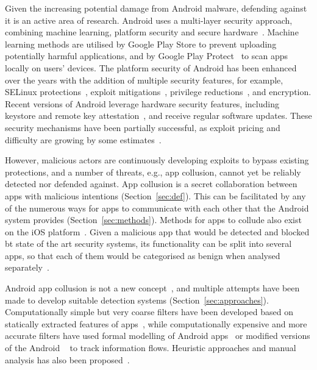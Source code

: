 \documentclass[article, oneside]{aaltoseries}
\newcommand{\Sref}[1]{Section~\ref{#1}}
\renewcommand\gls\cgls
\begin{document}
Given the increasing potential damage from Android malware, defending against it is an active area of research. Android uses a multi-layer security approach, combining machine learning, platform security and secure hardware~\cite{AOSP2018}. Machine learning methods are utilised by Google Play Store to prevent uploading potentially harmful applications, and by Google Play Protect~\cite{AOSPplayprotect} to scan apps locally on users' devices. The platform security of Android has been enhanced over the years with the addition of multiple security features, for example, SELinux protections~\cite[\href{https://source.android.com/security/selinux}{``Security-Enhanced Linux in Android''}]{AOSPsecurity}, exploit mitigations~\cite{Edge2016}, privilege reductions~\cite{Lawrence2017}, and encryption. Recent versions of Android leverage hardware security features, including keystore and remote key attestation~\cite{Willden2017}, and receive regular software updates. These security mechanisms have been partially successful, as exploit pricing and difficulty are growing by some estimates~\cite{AOSP2018}.

However, malicious actors are continuously developing exploits to bypass existing protections, and a number of threats, e.g., app collusion, cannot yet be reliably detected nor defended against. App collusion is a secret collaboration between apps with malicious intentions (\Sref{sec:def}). This can be facilitated by any of the numerous ways for apps to communicate with each other that the Android system provides (\Sref{sec:methods}). Methods for apps to collude also exist on the iOS platform~\cite{Deshotels2016}. Given a malicious app that would be detected and blocked bt state of the art security systems, its functionality can be split into several apps, so that each of them would be categorised as benign when analysed separately~\cite{Chen2018}.

Android app collusion is not a new concept~\cite{Schlegel2011}, and multiple attempts have been made to develop suitable detection systems (\Sref{sec:approaches}). Computationally simple but very coarse filters have been developed based on statically extracted features of apps~\cite{Asavoae2016, Chen2018}, while computationally expensive and more accurate filters have used formal modelling of Android apps~\cite{Asavoae2018} or modified versions of the Android \gls{os}~\cite{Enck2014} to track information flows. Heuristic approaches and manual analysis has also been proposed~\cite{Muttik2016}.
\end{document}
